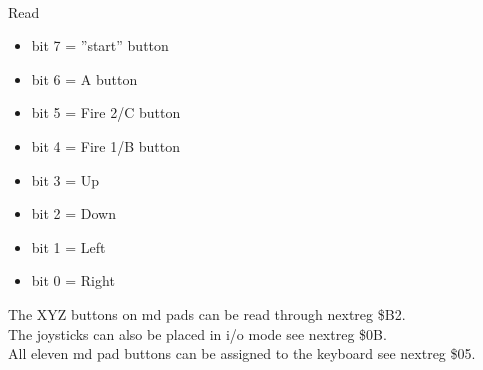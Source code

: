 \\
Read
\begin{itemize}
\item[] bit 7 = ''start'' button
\item[] bit 6 = A button
\item[] bit 5 = Fire 2/C button
\item[] bit 4 = Fire 1/B button
\item[] bit 3 = Up
\item[] bit 2 = Down
\item[] bit 1 = Left
\item[] bit 0 = Right
\end{itemize}
The XYZ buttons on md pads can be read through nextreg \$B2.\\
The joysticks can also be placed in i/o mode see nextreg \$0B.\\
All eleven md pad buttons can be assigned to the keyboard see nextreg \$05.


